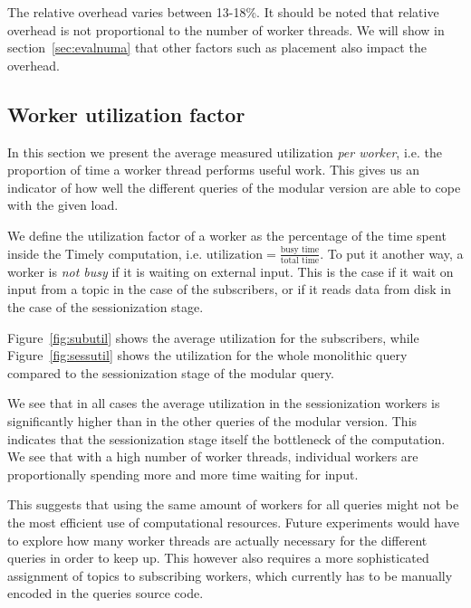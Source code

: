 The relative overhead varies between 13-18\%. It should be noted that relative
overhead is not proportional to the number of worker threads. We will show
in section~\ref{sec:evalnuma} that other factors such as placement also
impact the overhead.

\subsection{Worker utilization factor}

In this section we present the average measured utilization \emph{per worker},
i.e. the proportion of time a worker thread performs useful work.
This gives us an indicator of how well the different queries of the modular
version are able to cope with the given load.

We define the utilization factor of a worker as the percentage of
the time spent inside the Timely computation, i.e.
$\text{utilization} = \frac{\text{busy time}}{\text{total time}}$.
To put it another way, a worker is \emph{not busy} if it is waiting on external input.
This is the case if it wait on input from a topic in the case of the subscribers, 
or if it reads data from disk in the case of the sessionization stage.

Figure~\ref{fig:subutil} shows the average utilization for the subscribers, while
Figure~\ref{fig:sessutil} shows the utilization for the whole monolithic query
compared to the sessionization stage of the modular query. 

We see that in all cases the average utilization in the sessionization workers
is significantly higher than in the other queries of the modular version. This indicates
that the sessionization stage itself the bottleneck of the computation. 
We see that with a high number of worker threads, individual workers are proportionally
spending more and more time waiting for input.

This suggests that using the same amount of workers for all queries might
not be the most efficient use of computational resources. Future experiments would have to
explore how many worker threads are actually necessary for the different queries
in order to keep up. This however also requires a more sophisticated assignment of
topics to subscribing workers, which currently has to be manually encoded in
the queries source code.

